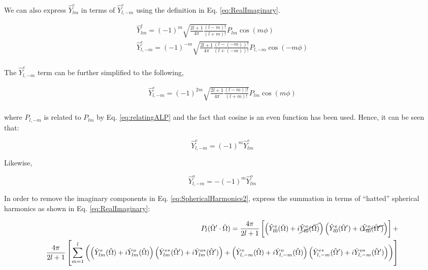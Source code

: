\begin{tcolorbox}[breakable]
We can also express \(\hat{Y}_{lm}^e\) in terms of \(\hat{Y}_{l,-m}^e\) using the definition in Eq. \eqref{eq:RealImaginary}. 

\begin{equation}
\begin{aligned}
\hat{Y}_{lm}^e=(-1)^m\sqrt{\frac{2l+1}{4\pi}\frac{(l-m)!}{(l+m)!}}P_{lm}\cos{(m\phi)}\\
\hat{Y}_{l,-m}^e=(-1)^{-m}\sqrt{\frac{2l+1}{4\pi}\frac{(l-(-m))!}{(l+(-m))!}}P_{l,-m}\cos{(-m\phi)}\\
\end{aligned}
\end{equation}

The \(\hat{Y}_{l,-m}^e\) term can be further simplified to the following, 

\begin{equation}
\begin{aligned}
\hat{Y}_{l,-m}^e=(-1)^{2m}\sqrt{\frac{2l+1}{4\pi}\frac{(l-m))!}{(l+m)!}}P_{lm}\cos{(m\phi)}\\
\end{aligned}
\end{equation}

where \(P_{l,-m}\) is related to \(P_{lm}\) by Eq. \eqref{eq:relatingALP} and the fact that cosine is an even function has been used. Hence, it can be seen that:

\begin{equation}
\label{eq:MinusMtoM}
\hat{Y}_{l,-m}^e=(-1)^m\hat{Y}_{lm}^e
\end{equation}

Likewise, 

\begin{equation}
\label{eq:MinusMtoMOdd}
\hat{Y}_{l,-m}^o=-(-1)^m\hat{Y}_{lm}^o
\end{equation}

\end{tcolorbox}

In order to remove the imaginary components in Eq. \eqref{eq:SphericalHarmonics2}, express the summation in terms of ``hatted'' spherical harmonics as shown in Eq. \eqref{eq:RealImaginary}:

\begin{equation}
\begin{aligned}
\label{eq:FullExpansion}
P_l(\hat{\Omega}  '\cdot\hat{\Omega}  )=\frac{4\pi}{2l+1}\left\lbrack \left(\hat{Y}_{l0}^e(\hat{\Omega}  )+i\cancel{\hat{Y}_{l0}^o(\hat{\Omega}  )}\right)\left(\hat{Y}_{l0}^e(\hat{\Omega}  ')+i\cancel{\hat{Y}_{l0}^o(\hat{\Omega}  ')}\right)\right\rbrack+\\
\frac{4\pi}{2l+1}\left\lbrack\sum_{m=1}^{l}\left(\left(\hat{Y}_{lm}^e(\hat{\Omega}  )+i\hat{Y}_{lm}^o(\hat{\Omega}  )\right)\left(\hat{Y}_{lm}^{e*}(\hat{\Omega}  ')+i\hat{Y}_{lm}^{o*}(\hat{\Omega}  ')\right)+\left(\hat{Y}_{l,-m}^e(\hat{\Omega}  )+i\hat{Y}_{l,-m}^o(\hat{\Omega}  )\right)\left(\hat{Y}_{l,-m}^{e*}(\hat{\Omega}  ')+i\hat{Y}_{l,-m}^{o*}(\hat{\Omega}  ')\right)\right)\right\rbrack\\
\end{aligned}
\end{equation}

